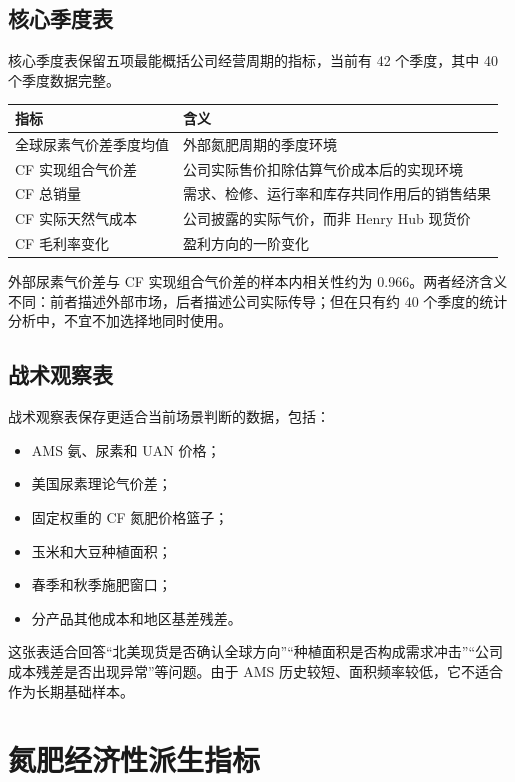 \documentclass[11pt,a4paper]{ctexart}
\begin{document}
\subsection{核心季度表}

核心季度表保留五项最能概括公司经营周期的指标，当前有 42 个季度，其中 40 个季度数据完整。

\begin{center}
\small
\begin{tabularx}{\textwidth}{L{4.4cm}Y}
\toprule
指标 & 含义 \\
\midrule
全球尿素气价差季度均值 & 外部氮肥周期的季度环境 \\
CF 实现组合气价差 & 公司实际售价扣除估算气价成本后的实现环境 \\
CF 总销量 & 需求、检修、运行率和库存共同作用后的销售结果 \\
CF 实际天然气成本 & 公司披露的实际气价，而非 Henry Hub 现货价 \\
CF 毛利率变化 & 盈利方向的一阶变化 \\
\bottomrule
\end{tabularx}
\normalsize
\end{center}

外部尿素气价差与 CF 实现组合气价差的样本内相关性约为 0.966。两者经济含义不同：前者描述外部市场，后者描述公司实际传导；但在只有约 40 个季度的统计分析中，不宜不加选择地同时使用。

\subsection{战术观察表}

战术观察表保存更适合当前场景判断的数据，包括：

\begin{itemize}
  \item AMS 氨、尿素和 UAN 价格；
  \item 美国尿素理论气价差；
  \item 固定权重的 CF 氮肥价格篮子；
  \item 玉米和大豆种植面积；
  \item 春季和秋季施肥窗口；
  \item 分产品其他成本和地区基差残差。
\end{itemize}

这张表适合回答“北美现货是否确认全球方向”“种植面积是否构成需求冲击”“公司成本残差是否出现异常”等问题。由于 AMS 历史较短、面积频率较低，它不适合作为长期基础样本。

\section{氮肥经济性派生指标}
\end{document}
